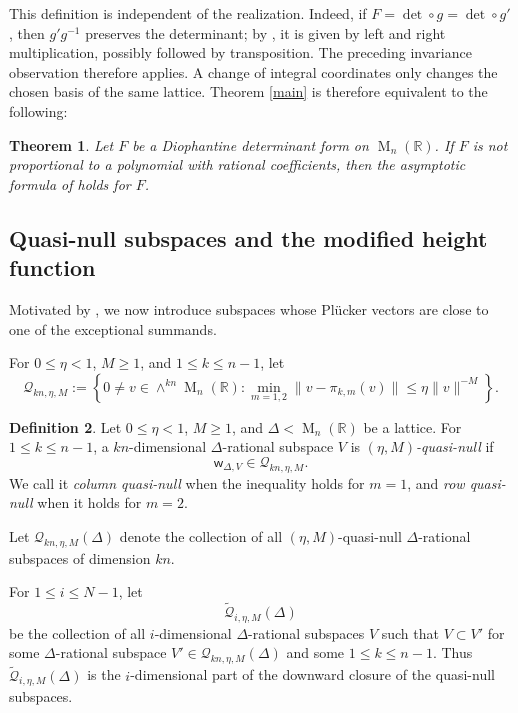 \documentclass[reqno,11pt]{amsart}
\numberwithin{equation}{section}
\newtheorem{theorem}{Theorem}[section]
\theoremstyle{definition}
\newtheorem{definition}[theorem]{Definition}
\theoremstyle{remark}
\newcommand{\op}{\operatorname}
\newcommand{\be}{\begin{equation}}
\newcommand{\ee}{\end{equation}}
\newcommand{\M}{\op{M}}
\begin{document}
This definition is independent of the realization. Indeed, if
$F=\det\circ g=\det\circ g'$, then $g'g^{-1}$ preserves the determinant;
by , it is given by left and right multiplication, possibly
followed by transposition. The preceding invariance observation therefore
applies. A change of integral coordinates only changes the chosen basis of the same lattice.
Theorem \ref{main} is therefore equivalent to the following:

\begin{theorem}\label{m2general}
Let $F$ be a Diophantine determinant form on $\M_n(\mathbb R)$. If
$F$ is not proportional to a polynomial with rational coefficients, then
the asymptotic formula of  holds for $F$.
\end{theorem}


\subsection{Quasi-null subspaces and the modified height function}

Motivated by , we now introduce
subspaces whose Pl\"ucker vectors are close to one of the exceptional
summands.

For $0\le\eta<1$, $M\ge1$, and $1\le k\le n-1$, let
\be\label{hkd}
\mathscr Q_{kn,\eta,M}
:=
\left\{
0\ne v\in\wedge^{kn}\M_n(\mathbb R):
\min_{m=1,2}\|v-\pi_{k,m}(v)\|
\le \eta\|v\|^{-M}
\right\}.
\ee


\begin{definition}
Let $0\le\eta<1$, $M\ge1$, and 
$\Delta<\M_n(\mathbb R)$ be a lattice. For $1\le k\le n-1$, a
$kn$-dimensional $\Delta$-rational subspace $V$ is
\emph{$(\eta,M)$-quasi-null} if 
$$\mathsf w_{\Delta,V}\in  \mathscr Q_{kn,\eta,M}.$$
We call it \emph{column quasi-null} when the inequality holds for $m=1$,
and \emph{row quasi-null} when it holds for $m=2$. 
\end{definition}
Let $\mathscr Q_{kn,\eta,M}(\Delta)$ denote the collection of all
$(\eta,M)$-quasi-null $\Delta$-rational subspaces of dimension $kn$.


For $1\le i\le N-1$, let
$$\widetilde{\mathscr Q}_{i,\eta,M}(\Delta)$$ be the collection of all
$i$-dimensional $\Delta$-rational subspaces $V$ 
such that $V\subset V'$ for some $\Delta$-rational subspace $V'\in \mathscr Q_{kn,\eta,M}(\Delta)$ and some $1\le k\le n-1$. Thus $\widetilde{\mathscr Q}_{i,\eta,M}(\Delta)$ is the
$i$-dimensional part of the downward closure of the quasi-null subspaces.
\end{document}
